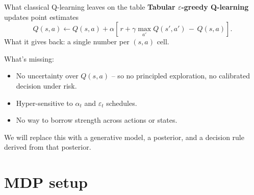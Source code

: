 \documentclass[10pt,aspectratio=169]{beamer}
\begin{document}
\begin{frame}{What classical Q-learning leaves on the table}
\textbf{Tabular $\varepsilon$-greedy Q-learning} updates point estimates
\begin{equation*}
Q(s,a) \leftarrow Q(s,a) + \alpha\!\left[\,r + \gamma \max_{a'} Q(s', a') \,-\, Q(s,a)\right].
\end{equation*}
What it gives back: a single number per $(s,a)$ cell.

\medskip
What's missing:
\begin{itemize}
  \item No \alert{uncertainty} over $Q(s,a)$ -- so no principled
        exploration, no calibrated decision under risk.
  \item Hyper-sensitive to $\alpha_t$ and $\varepsilon_t$ schedules.
  \item No way to \alert{borrow strength} across actions or states.
\end{itemize}

\medskip
We will replace this with a generative model, a posterior, and a
decision rule derived from that posterior.
\end{frame}

\section{MDP setup}
\end{document}
